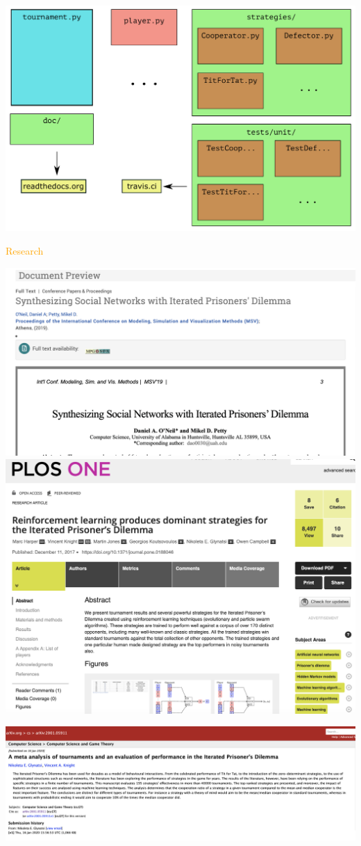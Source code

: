 \documentclass{beamer}
\begin{document}
\begin{frame}
    \centering
    \includegraphics[width=\textwidth]{static/outline_of_library.pdf}
\end{frame}

\begin{frame}
    \centering
    \Huge \textcolor{orange}{Research}
\end{frame}


\begin{frame}
    \centering
    \includegraphics[width=.54\textwidth]{static/paper_one.png}\hspace{6pt}
    \includegraphics[width=.40\textwidth]{static/paper_two.png}\vfill

    \includegraphics[width=.95\textwidth]{static/paper_three.png}
\end{frame}
\end{document}
